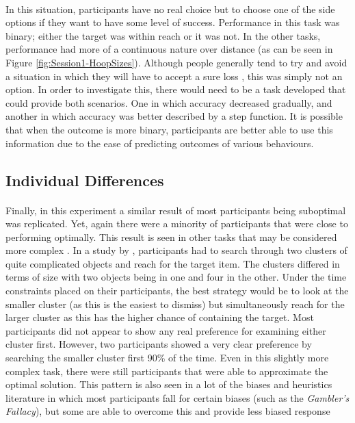 \documentclass[12pt]{article}
\begin{document}
\paragraph{} In this situation, participants have no real choice but to choose one of the side options if they want to have some level of success. Performance in this task was binary; either the target was within reach or it was not. In the other tasks, performance had more of a continuous nature over distance (as can be seen in Figure \ref{fig:Session1-HoopSizes}). Although people generally tend to try and avoid a situation in which they will have to accept a sure loss \citep{KahnemanProspect}, this was simply not an option. In order to investigate this, there would need to be a task developed that could provide both scenarios. One in which accuracy decreased gradually, and another in which accuracy was better described by a step function. It is possible that when the outcome is more binary, participants are better able to use this information due to the ease of predicting outcomes of various behaviours. 

\subsection*{Individual Differences}
\paragraph{} Finally, in this experiment a similar result of most participants being suboptimal was replicated. Yet, again there were a minority of participants that were close to performing optimally. This result is seen in other tasks that may be considered more complex \citep{Zhang2012handeye}. In a study by \cite{Zhang2012handeye}, participants had to search through two clusters of quite complicated objects and reach for the target item. The clusters differed in terms of size with two objects being in one and four in the other. Under the time constraints placed on their participants, the best strategy would be to look at the smaller cluster (as this is the easiest to dismiss) but simultaneously reach for the larger cluster as this has the higher chance of containing the target. Most participants did not appear to show any real preference for examining either cluster first. However, two participants showed a very clear preference by searching the smaller cluster first 90\% of the time. Even in this slightly more complex task, there were still participants that were able to approximate the optimal solution. This pattern is also seen in a lot of the biases and heuristics literature in which most participants fall for certain biases (such as the \textit{Gambler's Fallacy}), but some are able to overcome this and provide less biased response \cite{stanovich2008relative}
\end{document}
